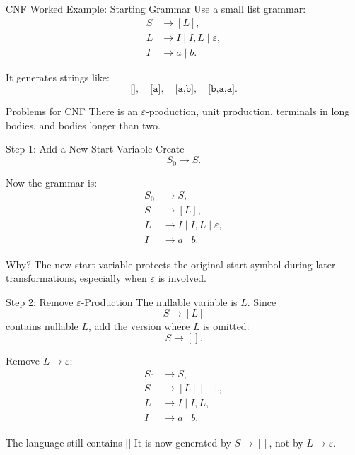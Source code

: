 \documentclass[aspectratio=169,10pt]{beamer}
\newcommand{\eps}{\varepsilon}
\newcommand{\code}[1]{\texttt{#1}}
\begin{document}
\begin{frame}{CNF Worked Example: Starting Grammar}
\small
Use a small list grammar:
\[
\begin{aligned}
S&\to [L],\\
L&\to I\mid I,L\mid\eps,\\
I&\to a\mid b.
\end{aligned}
\]

It generates strings like:
\[
\code{[]},\quad \code{[a]},\quad \code{[a,b]},\quad \code{[b,a,a]}.
\]

\begin{alertblock}{Problems for CNF}
There is an \(\eps\)-production, unit production, terminals in long bodies, and bodies longer than two.
\end{alertblock}
\end{frame}

\begin{frame}{Step 1: Add a New Start Variable}
\small
Create
\[
S_0\to S.
\]

Now the grammar is:
\[
\begin{aligned}
S_0&\to S,\\
S&\to [L],\\
L&\to I\mid I,L\mid\eps,\\
I&\to a\mid b.
\end{aligned}
\]

\begin{exampleblock}{Why?}
The new start variable protects the original start symbol during later transformations, especially when \(\eps\) is involved.
\end{exampleblock}
\end{frame}

\begin{frame}{Step 2: Remove \(\eps\)-Production}
\small
The nullable variable is \(L\). Since
\[
S\to [L]
\]
contains nullable \(L\), add the version where \(L\) is omitted:
\[
S\to [] .
\]

Remove \(L\to\eps\):
\[
\begin{aligned}
S_0&\to S,\\
S&\to [L]\mid [],\\
L&\to I\mid I,L,\\
I&\to a\mid b.
\end{aligned}
\]

\begin{alertblock}{The language still contains \(\code{[]}\)}
It is now generated by \(S\to []\), not by \(L\to\eps\).
\end{alertblock}
\end{frame}
\end{document}
